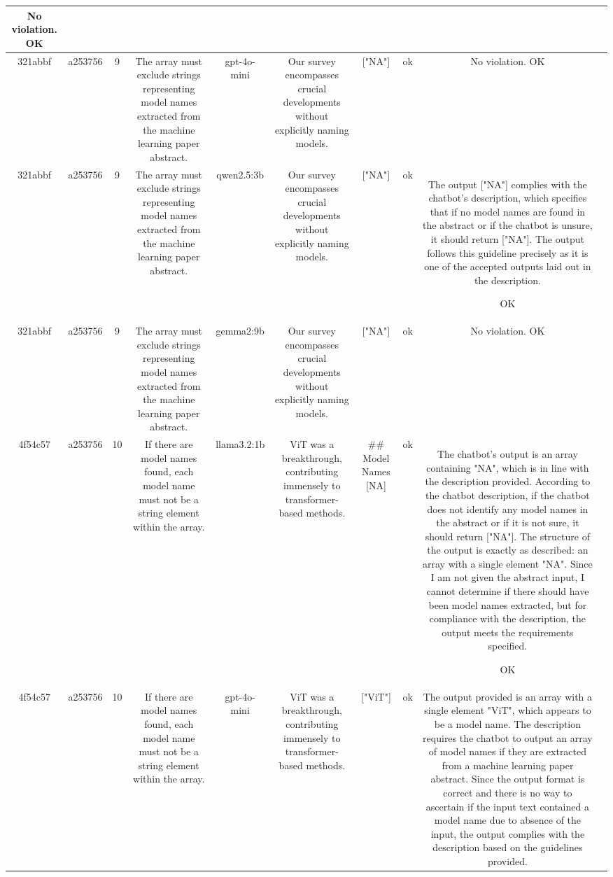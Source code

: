 \begin{table}[h!]
\begin{tabular}{|c|c|c|c|c|c|c|c|c|c|}
No violation.
OK & \\
\hline
321abbf & a253756 & 9 & The array must exclude strings representing model names extracted from the machine learning paper abstract. & gpt-4o-mini & Our survey encompasses crucial developments without explicitly naming models. & ["NA"] & ok & No violation.
OK & \\
\hline
321abbf & a253756 & 9 & The array must exclude strings representing model names extracted from the machine learning paper abstract. & qwen2.5:3b & Our survey encompasses crucial developments without explicitly naming models. & ["NA"] & ok & The output ["NA"] complies with the chatbot's description, which specifies that if no model names are found in the abstract or if the chatbot is unsure, it should return ["NA"]. The output follows this guideline precisely as it is one of the accepted outputs laid out in the description.

OK & \\
\hline
321abbf & a253756 & 9 & The array must exclude strings representing model names extracted from the machine learning paper abstract. & gemma2:9b & Our survey encompasses crucial developments without explicitly naming models. & ["NA"] 
 & ok & No violation. 
OK & \\
\hline
4f54c57 & a253756 & 10 & If there are model names found, each model name must not be a string element within the array. & llama3.2:1b & ViT was a breakthrough, contributing immensely to transformer-based methods. & ## Model Names
[NA] & ok & The chatbot's output is an array containing "NA", which is in line with the description provided. According to the chatbot description, if the chatbot does not identify any model names in the abstract or if it is not sure, it should return ["NA"]. The structure of the output is exactly as described: an array with a single element "NA". Since I am not given the abstract input, I cannot determine if there should have been model names extracted, but for compliance with the description, the output meets the requirements specified.

OK & \\
\hline
4f54c57 & a253756 & 10 & If there are model names found, each model name must not be a string element within the array. & gpt-4o-mini & ViT was a breakthrough, contributing immensely to transformer-based methods. & ["ViT"] & ok & The output provided is an array with a single element "ViT", which appears to be a model name. The description requires the chatbot to output an array of model names if they are extracted from a machine learning paper abstract. Since the output format is correct and there is no way to ascertain if the input text contained a model name due to absence of the input, the output complies with the description based on the guidelines provided.


\end{tabular}
\end{table}

